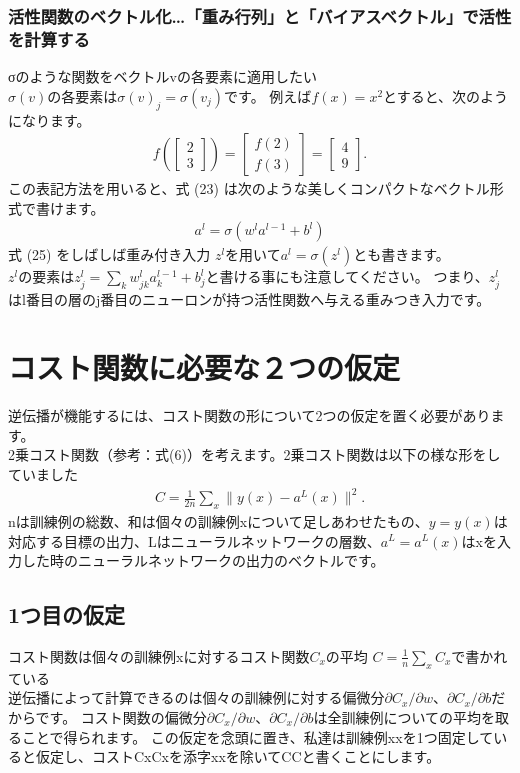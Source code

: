 \documentclass[11pt,a4paper,fleqn]{jsarticle}
\begin{document}
\subsubsection{活性関数のベクトル化…「重み行列」と「バイアスベクトル」で活性を計算する}
σのような関数をベクトルvの各要素に適用したい\\
$\sigma(v)$の各要素は$\sigma(v)_j = \sigma(v_j)$です。 例えば$f(x) = x^2$とすると、次のようになります。
\begin{eqnarray}
  f\left(\left[ \begin{array}{c} 2 \\ 3 \end{array} \right] \right)
  = \left[ \begin{array}{c} f(2) \\ f(3) \end{array} \right]
  = \left[ \begin{array}{c} 4 \\ 9 \end{array} \right].
\end{eqnarray}
この表記方法を用いると、式 (23) は次のような美しくコンパクトなベクトル形式で書けます。
\begin{eqnarray}
  a^{l} = \sigma(w^l a^{l-1}+b^l)
\end{eqnarray}
 式 (25) をしばしば{\large 重み付き入力} $z^l$を用いて$a^l = \sigma(z^l)$とも書きます。\\
$z^l$の要素は$z^l_j = \sum_k w^l_{jk} a^{l-1}_k+b^l_j$と書ける事にも注意してください。 つまり、$z^l_j$はl番目の層のj番目のニューロンが持つ活性関数へ与える重みつき入力です。
\\
\section{コスト関数に必要な２つの仮定}
逆伝播が機能するには、コスト関数の形について2つの仮定を置く必要があります。\\
2乗コスト関数（参考：式(6)）を考えます。2乗コスト関数は以下の様な形をしていました
\begin{eqnarray}
  C = \frac{1}{2n} \sum_x \|y(x)-a^L(x)\|^2.
\end{eqnarray}
nは訓練例の総数、和は個々の訓練例xについて足しあわせたもの、$y = y(x)$は対応する目標の出力、Lはニューラルネットワークの層数、$a^L = a^L(x)$はxを入力した時のニューラルネットワークの出力のベクトルです。
\subsection{1つ目の仮定}
コスト関数は個々の訓練例xに対するコスト関数$C_x$の平均 $C = \frac{1}{n} \sum_x C_x$で書かれている\\
逆伝播によって計算できるのは個々の訓練例に対する偏微分$\partial C_x / \partial w$、$\partial C_x / \partial b$だからです。 コスト関数の偏微分$\partial C_x / \partial w$、$\partial C_x / \partial b$は全訓練例についての平均を取ることで得られます。 この仮定を念頭に置き、私達は訓練例xxを1つ固定していると仮定し、コストCxCxを添字xxを除いてCCと書くことにします。
\newpage
\end{document}
